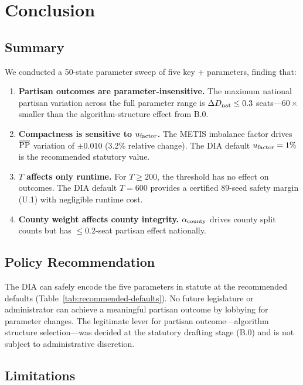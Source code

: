 \section{Conclusion}
\label{sec:conclusion}

\subsection{Summary}

We conducted a 50-state parameter sweep of five key \ar{} + \cs{}
parameters, finding that:

\begin{enumerate}
\item \textbf{Partisan outcomes are parameter-insensitive.}
      The maximum national partisan variation across the full parameter
      range is $\Delta D_{\rm nat} \leq 0.3$ seats---$60\times$ smaller
      than the algorithm-structure effect from B.0.
\item \textbf{Compactness is sensitive to $u_{\mathrm{factor}}$.}
      The METIS imbalance factor drives $\overline{\mathrm{PP}}$ variation of
      $\pm 0.010$ (3.2\% relative change).
      The DIA default $u_{\mathrm{factor}} = 1\%$ is the recommended statutory value.
\item \textbf{$T$ affects only runtime.}
      For $T \geq 200$, the \cs{} threshold has no effect on outcomes.
      The DIA default $T = 600$ provides a certified 89-seed safety margin
      (U.1) with negligible runtime cost.
\item \textbf{County weight affects county integrity.}
      $\alpha_{\mathrm{county}}$ drives county split counts but has $\leq 0.2$-seat
      partisan effect nationally.
\end{enumerate}

\subsection{Policy Recommendation}

The DIA can safely encode the five parameters in statute at the
recommended defaults (Table~\ref{tab:recommended-defaults}).
No future legislature or administrator can achieve a meaningful partisan
outcome by lobbying for parameter changes.
The legitimate lever for partisan outcome---algorithm structure selection---was
decided at the statutory drafting stage (B.0) and is not subject to
administrative discretion.

\subsection{Limitations}

